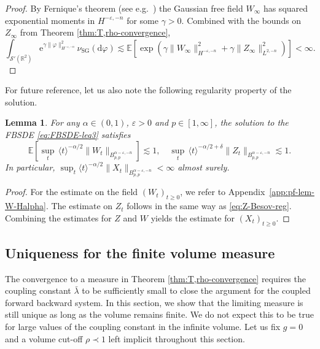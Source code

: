 \documentclass[11pt, a4paper]{scrartcl}
\numberwithin{equation}{section}
\theoremstyle{plain}
\newtheorem{lemma}[foo]{Lemma}
\theoremstyle{remark}
\newcommand{\mathd}{\mathrm{d}}
\newcommand{\mathe}{\mathrm{e}}
\newcommand{\tmop}[1]{\ensuremath{\operatorname{#1}}}
\newcommand{\tmtextit}[1]{\text{{\itshape{#1}}}}
\begin{document}
\begin{proof}
	By Fernique's theorem (see e.g.~{\cite[Theorem
		2.8.5.]{bogachevGaussianMeasures1998}}) the Gaussian free field $W_{\infty}$
	has squared exponential moments in $H^{- \varepsilon, - n}$ for some $\gamma
		> 0$. Combined with the bounds on $Z_{\infty}$ from Theorem
	\ref{thm:T,rho-convergence},
	\[ \int_{\mathcal{S}' (\mathbb{R}^2)} \mathe^{\gamma \| \varphi \|_{H^{-
							\varepsilon, - n}}^2} \nu_{\tmop{SG}} (\mathd \varphi) \lesssim
		\mathbb{E} [\exp (\gamma \| W_{\infty} \|_{H^{- \varepsilon, - n}}^2 +
			\gamma \| Z_{\infty} \|_{L^{2, - n}}^2)] < \infty . \]
\end{proof}

For future reference, let us also note the following regularity property of
the solution.

\begin{lemma}
	\label{lem:W-Halpha}For any $\alpha \in (0, 1)$, $\varepsilon > 0$ and $p
		\in [1, \infty]$, the solution to the FBSDE \eqref{eq:FBSDE-leq3} satisfies
	\[ \mathbb{E} \left[\sup_t\, \langle t \rangle^{- \alpha / 2} \| W_t \|_{B^{\alpha
							- \varepsilon, - n}_{p, p}}\right] \lesssim 1, \quad \sup_t\,  \langle t
		\rangle^{- \alpha / 2 + \delta} \| Z_t \|_{B^{\alpha - \varepsilon, -
						n}_{p, p}} \lesssim 1. \]
	In particular, $\sup_t  \langle t \rangle^{- \alpha / 2} \| X_t
		\|_{B^{\alpha - \varepsilon, - n}_{p, p}} < \infty$ almost surely.
\end{lemma}

\begin{proof}
	For the estimate on the field $(W_t)_{t \geqslant 0}$, we refer to
	Appendix~\ref{app:pf-lem-W-Halpha}. The estimate on $Z_t$ follows in the
	same way as \eqref{eq:Z-Besov-reg}. Combining the estimates for $Z$ and $W$
	yields the estimate for $(X_t)_{t \geqslant 0}$.
\end{proof}

\subsection{Uniqueness for the finite volume measure}\label{sec:finite-vol}

The convergence to a \tmtextit{unique} measure in Theorem \ref{thm:T,rho-convergence} requires the
coupling constant $\bar{\lambda}$ to be sufficiently small to close the argument for
the coupled forward backward system. In this section, we show that the limiting measure is still unique as long as the volume remains finite. We do
not expect this to be true for large values of the coupling constant in the
infinite volume. Let us fix $g = 0$ and a volume cut-off $\rho \prec 1$ left
implicit throughout this section.
\end{document}
